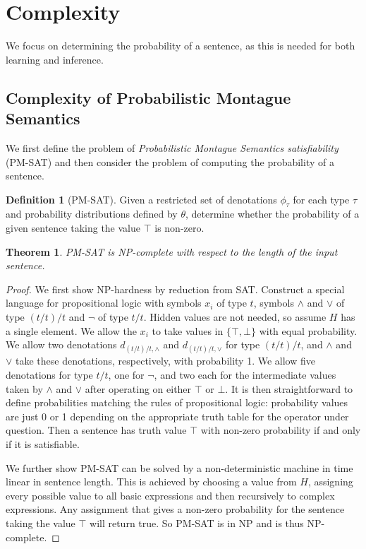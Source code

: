 \documentclass[a4paper,11pt]{article}
\newtheorem*{theorem}{Theorem}
\theoremstyle{definition}
\newtheorem*{definition}{Definition}
\begin{document}
\section{Complexity}

We focus on determining the probability of a sentence,
as this is needed for both learning and inference.

\subsection{Complexity of Probabilistic Montague Semantics}

We first define the problem of {\em Probabilistic Montague Semantics satisfiability\/} (PM-SAT) and then consider the problem of computing the probability of a sentence.

\begin{definition}[PM-SAT]

  Given 
  a restricted set of
  denotations $\phi_\tau$ for each type $\tau$ and probability
  distributions defined by $\theta$, determine whether the probability
  of a given sentence taking the value $\top$ is non-zero.
\end{definition}

\begin{theorem}
  \emph{PM-SAT} is NP-complete with respect to the length of the input
  sentence.
\end{theorem}

\begin{proof}
We first show NP-hardness by reduction from SAT. Construct a special
language for propositional logic with symbols $x_i$ of type $t$,
symbols $\land$ and $\lor$ of type $(t/t)/t$ and $\lnot$ of type
$t/t$. Hidden values are not needed, so assume $H$ has a single
element. We allow the $x_i$ to take values in $\{\top, \bot\}$
with equal probability. We allow two denotations $d_{(t/t)/t, \land}$
and $d_{(t/t)/t, \lor}$ for type $(t/t)/t$, and $\land$ and $\lor$
take these denotations, respectively, with probability 1. We allow five
denotations for type $t/t$, one for $\lnot$, and two each for the
intermediate values taken by $\land$ and $\lor$ after operating on
either $\top$ or $\bot$. It is then straightforward to define
probabilities matching the rules of propositional logic: probability
values are just 0 or 1 depending on the appropriate truth table for
the operator under question. Then a sentence has truth value $\top$
with non-zero probability if and only if it is satisfiable.

We further show PM-SAT can be solved by a non-deterministic machine in time linear in sentence length. This is achieved by
choosing a value from $H$, assigning every possible value to all basic
expressions and then recursively to complex expressions. Any
assignment that gives a non-zero probability for the
sentence taking the value $\top$ will return true. So
PM-SAT is in NP and is thus NP-complete.
\end{proof}
\end{document}
